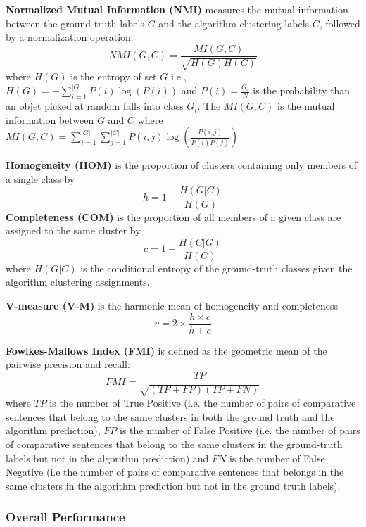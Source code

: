 \textbf{Normalized Mutual Information (NMI)} measures the mutual information between the ground truth labels $G$ and the algorithm clustering labels $C$, followed by a normalization operation:
$$ NMI(G, C) = \frac{MI(G, C)}{\sqrt{H(G) H(C)}} $$
where $H(G)$ is the entropy of set $G$ i.e., $H(G) = - \sum^{|G|}_{i=1}P(i) \log (P(i)) $ and $P(i) = \frac{G_i}{N}$ is the probability than an objet picked at random falls into class $G_i$.
The $MI(G, C)$ is the mutual information between $G$ and $C$ where $MI(G, C) = \sum^{|G|}_{i=1} \sum^{|C|}_{j=1} P(i, j) \log ( \frac{P(i, j)}{P(i)P(j)} )$


\textbf{Homogeneity (HOM)} is the proportion of clusters containing only members of a single class by
$$ h = 1 - \frac{H(G|C)}{H(G)} $$
\textbf{Completeness (COM)} is the proportion of all members of a given class are assigned to the same cluster by
$$ c = 1 - \frac{H(C|G)}{H(C)} $$
where $H(G|C)$ is the conditional entropy of the ground-truth classes given the algorithm clustering assignments.

\textbf{V-measure (V-M)} is the harmonic mean of homogeneity and completeness
$$ v = 2 \times \frac{h\times c}{h+c} $$

\textbf{Fowlkes-Mallows Index (FMI)} is defined as the geometric mean of the pairwise precision and recall:
$$ FMI = \frac{TP}{\sqrt{(TP+FP)(TP+FN)}} $$
where $TP$ is the number of True Positive (i.e. the number of pairs of comparative sentences that belong to the same clusters in both the ground truth and the algorithm prediction), $FP$ is the number of False Positive (i.e. the number of pairs of comparative sentences that belong to the same clusters in the ground-truth labels but not in the algorithm prediction) and $FN$ is the number of False Negative (i.e the number of pairs of comparative sentences that belongs in the same clusters in the algorithm prediction but not in the ground truth labels).

\subsubsection{Overall Performance}


